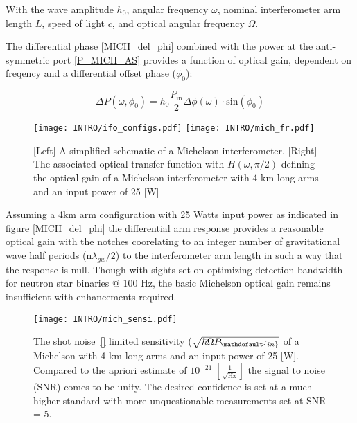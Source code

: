With the wave amplitude $h_0$, angular frequency $\omega$, nominal interferometer arm length $L$, speed of light $c$, and optical angular frequency $\Omega$.

The differential phase \ref{MICH_del_phi} combined with the power at the anti-symmetric port \ref{P_MICH_AS} provides a function of optical gain, dependent on freqency and a differential offset phase ($\phi_0$):

\begin{equation}
	\Delta P(\omega, \phi_0) = h_0 \frac{P_\mathrm{in}}{2} \Delta \phi (\omega) \cdot \mathrm{sin}(\phi_0)
\end{equation}

\begin{figure}[ht!]
	\begin{subcaptiongroup}
		\texttt{[image: INTRO/ifo\_configs.pdf]}
		\texttt{[image: INTRO/mich\_fr.pdf]}
 	\end{subcaptiongroup}
  	\hfill
	\caption{[Left] A simplified schematic of a Michelson interferometer. [Right] The associated optical transfer function with $H(\omega, \pi/2)$ defining the optical gain of a Michelson interferometer with 4 km long arms and an input power of 25 [W]}
		\label{fig:mich}
\end{figure}
\FloatBarrier

Assuming a 4km arm configuration with 25 Watts input power as indicated in figure \ref{MICH_del_phi} the differential arm response provides a reasonable optical gain with the notches coorelating to an integer number of gravitational wave half periods ($\mathrm{n}\lambda_{gw} / 2$) to the interferometer arm length in such a way that the response is null. Though with sights set on optimizing detection bandwidth for neutron star binaries @ 100 Hz, the basic Michelson optical gain remains insufficient with enhancements required.  

\begin{figure}[ht!]
	\centering
	\texttt{[image: INTRO/mich\_sensi.pdf]}
	\caption{The shot noise~\ref{} limited sensitivity ($\sqrt{\hbar \Omega P_\mathdefault{in}}$ of a Michelson with 4 km long arms and an input power of 25 [W]. Compared to the apriori estimate of $10^{-21} \; [\frac{1}{\sqrt{\mathrm{Hz}}}]$ the signal to noise (SNR) comes to be unity. The desired confidence is set at a much higher standard with more unquestionable measurements set at SNR = 5.}
	\label{fig:michsensitivity}
\end{figure}

